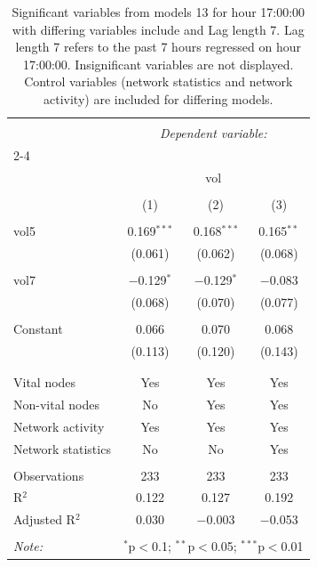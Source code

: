 
\begin{table}[!htbp] \centering 
  \caption{Significant variables from models 13 for hour 17:00:00 with differing variables include 
                               and Lag length 7. Lag length 7 refers to the past 7 hours regressed on hour 17:00:00. 
                               Insignificant variables are not displayed. 
                               Control variables (network statistics and network activity) are 
                               included for differing models.} 
  \label{Volumemodels2_t_hourlagged4} 
\scriptsize 
\begin{tabular}{@{\extracolsep{5pt}}lccc} 
\\[-1.8ex]\hline 
\hline \\[-1.8ex] 
 & \multicolumn{3}{c}{\textit{Dependent variable:}} \\ 
\cline{2-4} 
\\[-1.8ex] & \multicolumn{3}{c}{vol} \\ 
\\[-1.8ex] & (1) & (2) & (3)\\ 
\hline \\[-1.8ex] 
 vol5 & 0.169$^{***}$ & 0.168$^{***}$ & 0.165$^{**}$ \\ 
  & (0.061) & (0.062) & (0.068) \\ 
  & & & \\ 
 vol7 & $-$0.129$^{*}$ & $-$0.129$^{*}$ & $-$0.083 \\ 
  & (0.068) & (0.070) & (0.077) \\ 
  & & & \\ 
 Constant & 0.066 & 0.070 & 0.068 \\ 
  & (0.113) & (0.120) & (0.143) \\ 
  & & & \\ 
\hline \\[-1.8ex] 
Vital nodes & Yes & Yes & Yes \\ 
Non-vital nodes & No & Yes & Yes \\ 
Network activity & Yes & Yes & Yes \\ 
Network statistics & No & No & Yes \\ 
\hline &  &  &  \\ 
Observations & 233 & 233 & 233 \\ 
R$^{2}$ & 0.122 & 0.127 & 0.192 \\ 
Adjusted R$^{2}$ & 0.030 & $-$0.003 & $-$0.053 \\ 
\hline 
\hline \\[-1.8ex] 
\textit{Note:}  & \multicolumn{3}{r}{$^{*}$p$<$0.1; $^{**}$p$<$0.05; $^{***}$p$<$0.01} \\ 
\end{tabular} 
\end{table} 
